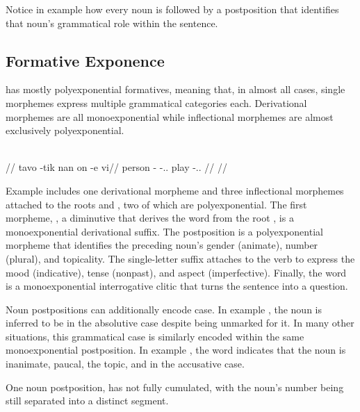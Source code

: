 Notice in example  how every noun is followed by a postposition that identifies that noun's grammatical role within the sentence.


\subsection{Formative Exponence}
\label{sec:tvk-exponence}

\langtvk{} has mostly polyexponential formatives, meaning that, in almost all cases, single morphemes express multiple grammatical categories each\autocite{wals-21}. Derivational morphemes are all monoexponential while inflectional morphemes are almost exclusively polyexponential.

	\begingl
		\glpreamble{}\\
		//
		\gla tavo -tik nan on -e vi//
		\glb person -\Dim{} -\An.\Pl.\Top{} play -\Ind.\Npst.\Ipfv{} \Int//
		\glft {}//
	\endgl
\xe

Example  includes one derivational morpheme and three inflectional morphemes attached to the roots  and , two of which are polyexponential. The first morpheme, , a diminutive that derives the word  from the root , is a monoexponential derivational suffix. The postposition  is a polyexponential morpheme that identifies the preceding noun's gender (animate), number (plural), and topicality. The single-letter suffix  attaches to the verb to express the mood (indicative), tense (nonpast), and aspect (imperfective). Finally, the word  is a monoexponential interrogative clitic that turns the sentence into a question.

Noun postpositions can additionally encode case. In example , the noun  is inferred to be in the absolutive case despite being unmarked for it. In many other situations, this grammatical case is similarly encoded within the same monoexponential postposition. In example , the word  indicates that the noun  is inanimate, paucal, the topic, and in the accusative case.

One noun postposition,  has not fully cumulated, with the noun's number being still separated into a distinct segment.

